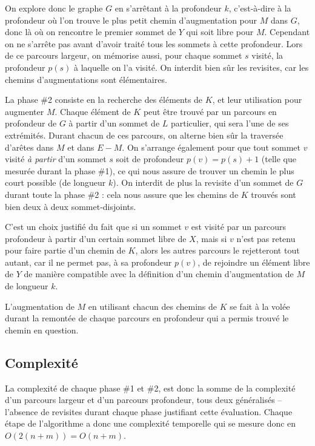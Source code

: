  On explore donc le graphe $G$ en s'arrêtant à la profondeur $k$, c'est-à-dire à la profondeur où l'on trouve le plus petit chemin d'augmentation pour $M$ dans $G$, donc là où on rencontre le premier sommet de $Y$ qui soit libre pour 
 $M$. Cependant on ne s'arrête pas avant d'avoir traité tous les sommets à cette profondeur. Lors de ce parcours largeur, on mémorise aussi, pour chaque sommet $s$ visité, la profondeur $p(s)$ à laquelle on l'a visité. On interdit bien sûr les revisites, car les chemins d'augmentations sont élémentaires. \medskip

 La phase \#2 consiste en la recherche des éléments de $K$, et leur utilisation pour augmenter $M$. Chaque élément de $K$ peut être trouvé par un parcours en profondeur de $G$ à partir d'un sommet de $L$ particulier, qui sera l'une de ses extrémités. Durant chacun de ces parcours, on alterne bien sûr la traversée d'arêtes dans $M$ et dans $E\minus M$. On s'arrange également pour que tout sommet $v$ visité \emph{à partir} d'un sommet $s$ soit de profondeur $p(v) = p(s) + 1$ (telle que mesurée durant la phase \#1), ce qui nous assure de trouver un chemin le plus court possible (de longueur $k$). On interdit de plus la revisite d'un sommet de $G$ durant toute la phase \#2 : cela nous assure que les chemins de $K$ trouvés sont bien deux à deux sommet-disjoints.
 
 C'est un choix justifié du fait que si un sommet $v$ est visité par un parcours profondeur à partir d'un certain sommet libre de $X$, mais si $v$ n'est pas retenu pour faire partie d'un chemin de $K$, alors les autres parcours le rejetteront tout autant, car il ne permet pas, à sa profondeur $p(v)$, de rejoindre un élément libre de $Y$ de manière compatible avec la définition d'un chemin d'augmentation de $M$ de longueur $k$.
 
 L'augmentation de $M$ en utilisant chacun des chemins de $K$ se fait à la volée durant la remontée de chaque parcours en profondeur qui a permis trouvé le chemin en question.

 \subsection{Complexité}
 
  La complexité de chaque phase \#1 et \#2, est donc la somme de la complexité d'un parcours largeur et d'un parcours profondeur, tous deux généralisés -- l'absence de revisites durant chaque phase justifiant cette évaluation. Chaque étape de l'algorithme a donc une complexité temporelle qui se mesure donc en $O(2(n+m)) = O(n + m)$.
 
